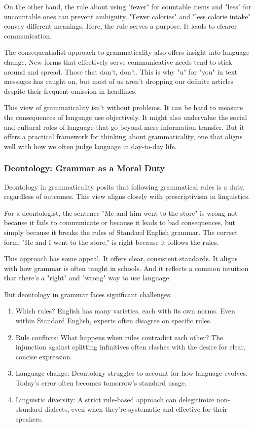 On the other hand, the rule about using "fewer" for countable items and "less" for uncountable ones can prevent ambiguity. "Fewer calories" and "less calorie intake" convey different meanings. Here, the rule serves a purpose. It leads to clearer communication.

The consequentialist approach to grammaticality also offers insight into language change. New forms that effectively serve communicative needs tend to stick around and spread. Those that don't, don't. This is why "u" for "you" in text messages has caught on, but most of us aren't dropping our definite articles despite their frequent omission in headlines.

This view of grammaticality isn't without problems. It can be hard to measure the consequences of language use objectively. It might also undervalue the social and cultural roles of language that go beyond mere information transfer. But it offers a practical framework for thinking about grammaticality, one that aligns well with how we often judge language in day-to-day life.

\subsubsection{Deontology: Grammar as a Moral Duty}

Deontology in grammaticality posits that following grammatical rules is a duty, regardless of outcomes. This view aligns closely with prescriptivism in linguistics.

For a deontologist, the sentence "Me and him went to the store" is wrong not because it fails to communicate or because it leads to bad consequences, but simply because it breaks the rules of Standard English grammar. The correct form, "He and I went to the store," is right because it follows the rules.

This approach has some appeal. It offers clear, consistent standards. It aligns with how grammar is often taught in schools. And it reflects a common intuition that there's a "right" and "wrong" way to use language.

But deontology in grammar faces significant challenges:

\begin{enumerate}
    \item Which rules? English has many varieties, each with its own norms. Even within Standard English, experts often disagree on specific rules.

    \item Rule conflicts: What happens when rules contradict each other? The injunction against splitting infinitives often clashes with the desire for clear, concise expression.

    \item Language change: Deontology struggles to account for how language evolves. Today's error often becomes tomorrow's standard usage.

    \item Linguistic diversity: A strict rule-based approach can delegitimize non-standard dialects, even when they're systematic and effective for their speakers.
\end{enumerate}

